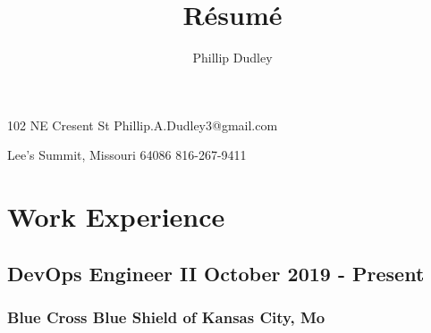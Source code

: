 \documentclass{article}
\title{R\'esum\'e}
\author{Phillip Dudley}
\makeatletter
\renewcommand{\maketitle}{
  \begin{center}
  {\huge\bfseries\theauthor}

  \vspace{.25em}

  102 NE Cresent St
  \hfill
  Phillip.A.Dudley3@gmail.com

  Lee's Summit, Missouri 64086
  \hfill
  816-267-9411
\end{center}
}
\makeatother
\begin{document}
  \maketitle

  \section{Work Experience}

    \subsection{DevOps Engineer II {\hfill} October 2019 - Present}

      \subsubsection{Blue Cross Blue Shield of Kansas City, Mo}
\end{document}
